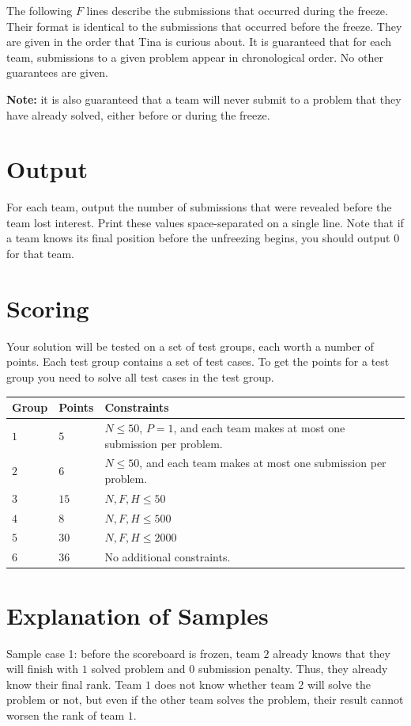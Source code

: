 The following $F$ lines describe the submissions that occurred during the freeze.
Their format is identical to the submissions that occurred before the freeze.
They are given in the order that Tina is curious about.
It is guaranteed that for each team, submissions to a given problem appear in chronological order.
No other guarantees are given.

\textbf{Note:} it is also guaranteed that a team will never submit to a problem that they have
already solved, either before or during the freeze.

\section*{Output}
For each team, output the number of submissions that were revealed before the team lost interest.
Print these values space-separated on a single line.
Note that if a team knows its final position before the unfreezing begins, you should output $0$
for that team.

\section*{Scoring}
Your solution will be tested on a set of test groups, each worth a number of points. Each test group contains
a set of test cases. To get the points for a test group you need to solve all test cases in the test group.

\begin{center}
\begin{tabular}{| l | l | p{12cm} |}
  \hline
  \textbf{Group} & \textbf{Points} & \textbf{Constraints} \\ \hline
  $1$ & $5$ & $N \leq 50$, $P = 1$, and each team makes at most one submission per problem. \\ \hline
  $2$ & $6$ & $N \leq 50$, and each team makes at most one submission per problem. \\ \hline
  $3$ & $15$ & $N, F, H \leq 50$ \\ \hline
  $4$ & $8$ & $N, F, H \leq 500$ \\ \hline
  $5$ & $30$ & $N, F, H \leq 2000$ \\ \hline
  $6$ & $36$ & No additional constraints. \\ \hline
\end{tabular}
\end{center}

\section*{Explanation of Samples}
Sample case 1: before the scoreboard is frozen, team $2$ already knows that they will finish with
$1$ solved problem and $0$ submission penalty.
Thus, they already know their final rank.
Team $1$ does not know whether team $2$ will solve the problem or not, but even if the other team
solves the problem, their result cannot worsen the rank of team $1$.

